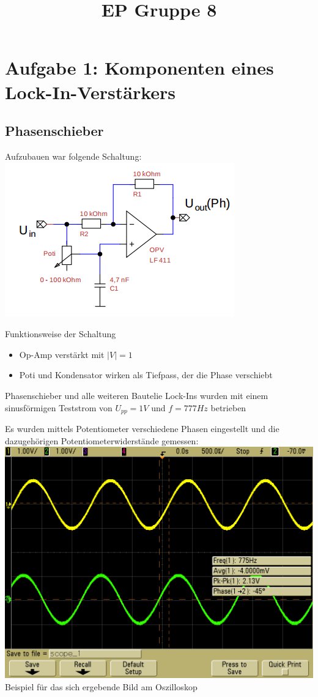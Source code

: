 \documentclass[compress,11pt]{beamer}
\title{EP Gruppe 8}
\begin{document}
\section{Aufgabe 1: Komponenten eines Lock-In-Verstärkers}
\subsection{Phasenschieber}

\begin{frame}
Aufzubauen war folgende Schaltung:\\
\includegraphics[width=.7\textwidth]{schalt/phasenschieber}\\

\end{frame}
\begin{frame}
\begin{block}{Funktionsweise der Schaltung}
\begin{itemize}
\item Op-Amp verstärkt mit $|V| = 1$
\item Poti und Kondensator wirken als Tiefpass, der die Phase verschiebt
\end{itemize}
\end{block}
Phasenschieber und alle weiteren Bautelie Lock-Ins wurden mit einem sinusförmigen Teststrom von $U_{pp} = 1 V$ und $f = 777 Hz$ betrieben
\end{frame}
\begin{frame}
Es wurden mittels Potentiometer verschiedene Phasen eingestellt und die dazugehörigen Potentiometerwiderstände gemessen:\\
\includegraphics[width=.7\textwidth]{../oszi/scope_1}\\
Beispiel für das sich ergebende Bild am Oszilloskop

\end{frame}
\end{document}
